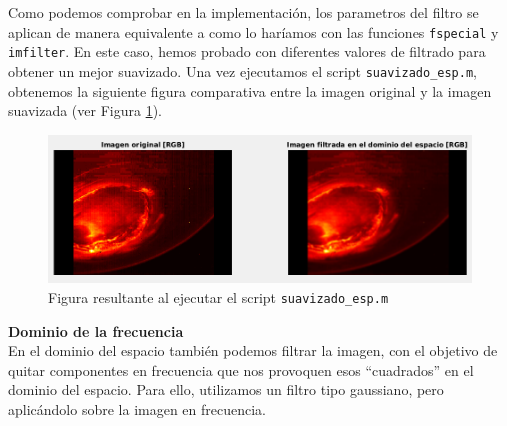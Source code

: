 \documentclass[12pt]{article}
\begin{document}
	\vspace{10px}

	\noindent Como podemos comprobar en la implementación, los parametros del filtro se aplican de manera equivalente a como lo haríamos con las funciones \texttt{fspecial} y \texttt{imfilter}. En este caso, hemos probado con diferentes valores de filtrado para obtener un mejor suavizado. Una vez ejecutamos el script \texttt{suavizado\_esp.m}, obtenemos la siguiente figura comparativa entre la imagen original y la imagen suavizada (ver Figura \ref{img: suavizado esp}).
	
	\vspace{10px}
	
	\begin{figure}[h]
		\begin{center}
			\includegraphics[width=1\textwidth]{img/suavizado_esp.png}
			\caption{Figura resultante al ejecutar el script \texttt{suavizado\_esp.m}}
			\label{img: suavizado esp}
		\end{center}
	\end{figure}

	\pagebreak
	
	\noindent \textbf{\large Dominio de la frecuencia} \\
	
	\noindent En el dominio del espacio también podemos filtrar la imagen, con el objetivo de quitar componentes en frecuencia que nos provoquen esos ``cuadrados'' en el dominio del espacio. Para ello, utilizamos un filtro tipo gaussiano, pero aplicándolo sobre la imagen en frecuencia.
	
\end{document}
